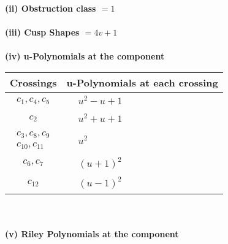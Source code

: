 \documentclass[1p]{elsarticle_modified}
\theoremstyle{definition}
\begin{document}
\flushleft \textbf{(ii) Obstruction class $= 1$}\\~\\
\flushleft \textbf{(iii) Cusp Shapes $= 4 v+1$}\\~\\
\newpage\renewcommand{\arraystretch}{1}
\flushleft \textbf{(iv) u-Polynomials at the component}\newline \\
\begin{tabular}{m{50pt}|m{274pt}}
Crossings & \hspace{64pt}u-Polynomials at each crossing \\
\hline $$\begin{aligned}c_{1},c_{4},c_{5}\end{aligned}$$&$\begin{aligned}
&u^2- u+1
\end{aligned}$\\
\hline $$\begin{aligned}c_{2}\end{aligned}$$&$\begin{aligned}
&u^2+u+1
\end{aligned}$\\
\hline $$\begin{aligned}c_{3},c_{8},c_{9}\\c_{10},c_{11}\end{aligned}$$&$\begin{aligned}
&u^2
\end{aligned}$\\
\hline $$\begin{aligned}c_{6},c_{7}\end{aligned}$$&$\begin{aligned}
&(u+1)^2
\end{aligned}$\\
\hline $$\begin{aligned}c_{12}\end{aligned}$$&$\begin{aligned}
&(u-1)^2
\end{aligned}$\\
\hline
\end{tabular}\\~\\
\newpage\renewcommand{\arraystretch}{1}
\flushleft \textbf{(v) Riley Polynomials at the component}\newline \\
\end{document}
